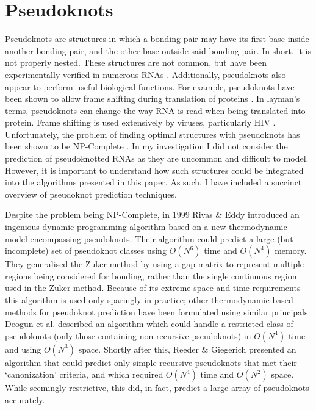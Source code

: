 \documentclass{cshonours}
\begin{document}
\section{Pseudoknots}

Pseudoknots are structures in which a bonding pair may have its first
base inside another bonding pair, and the other base outside said bonding pair.
In short, it is not properly nested. These structures are not common,
but have been experimentally verified in numerous RNAs \cite{taufer2009pseudobase}. Additionally, pseudoknots also appear to perform useful biological functions. For
example, pseudoknots have been shown to allow frame shifting during translation
of proteins \cite{namy2006mechanical}. In layman's terms, pseudoknots can change the way RNA is read
when being translated into protein. Frame shifting is used extensively by
viruses, particularly HIV \cite{namy2006mechanical}. Unfortunately, the problem of finding optimal
structures with pseudoknots has been shown to be NP-Complete \cite{lyngso2000rna}. In my investigation I did not consider the prediction of pseudoknotted RNAs as they are uncommon and difficult to model. However, it is important to understand how such structures could be integrated into the algorithms presented in this paper. As such, I have included a succinct overview of pseudoknot prediction techniques.

Despite the problem being NP-Complete, in 1999 Rivas \& Eddy \cite{rivas1999dynamic} introduced an ingenious dynamic
programming algorithm based on a new thermodynamic model encompassing pseudoknots. Their algorithm could predict a large (but incomplete) set of pseudoknot classes using
$O(N^6)$ time and $O(N^4)$ memory. They generalised the Zuker method by using a gap matrix to represent multiple regions being considered for bonding, rather than
the single continuous region used in the Zuker method. Because of its extreme
space and time requirements this algorithm is used only sparingly in practice; other thermodynamic based methods for pseudoknot prediction have
been formulated using similar principals. Deogun et al. \cite{deogun2004rna} described an algorithm which could handle a restricted class of pseudoknots (only those containing
non-recursive pseudoknots) in $O(N^4)$ time and using $O(N^3)$ space. Shortly after this, Reeder \& Giegerich \cite{reeder2004design} presented an algorithm that could predict
only simple recursive pseudoknots that met their `canonization' criteria, and which required $O(N^4)$ time and $O(N^2)$ space. While
seemingly restrictive, this did, in fact, predict a large array of pseudoknots accurately. 
\end{document}
